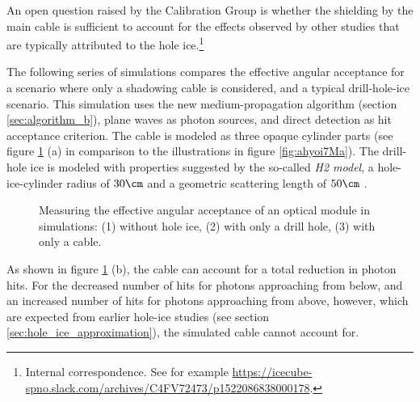 An open question raised by the \icecube Calibration Group is whether the shielding by the main cable is sufficient to account for the effects observed by other studies that are typically attributed to the hole ice.\footnote{Internal correspondence. See for example \url{https://icecube-spno.slack.com/archives/C4FV72473/p1522086838000178}.}


The following series of simulations compares the effective angular acceptance for a scenario where only a shadowing cable is considered, and a typical drill-hole-ice scenario.
This simulation uses the new medium-propagation algorithm (section \ref{sec:algorithm_b}), plane waves as photon sources, and direct detection as hit acceptance criterion. The cable is modeled as three opaque cylinder parts (see figure \ref{fig:Ohw1aibu} (a) in comparison to the illustrations in figure \ref{fig:ahyoi7Ma}). The drill-hole ice is modeled with properties suggested by the so-called \textit{H2 model}, a hole-ice-cylinder radius of $30\cm$ and a geometric scattering length of $50\cm$ \cite{holeicestudieswithyag}.


\begin{figure}[htbp]
  \hfill
  \hfill
  \caption{Measuring the effective angular acceptance of an optical module in simulations: (1) without hole ice, (2) with only a drill hole, (3) with only a cable.}
  \label{fig:Ohw1aibu}
\end{figure}

As shown in figure \ref{fig:Ohw1aibu} (b), the cable can account for a total reduction in photon hits. For the decreased number of hits for photons approaching from below, and an increased number of hits for photons approaching from above, however, which are expected from earlier hole-ice studies (see section \ref{sec:hole_ice_approximation}), the simulated cable cannot account for.

